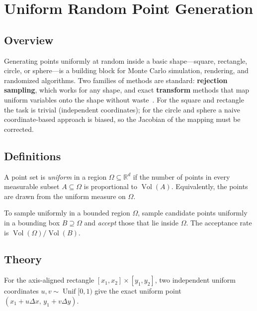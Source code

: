 \section{Uniform Random Point Generation}
\label{sec:uniform_random_points}

\subsection{Overview}
Generating points uniformly at random inside a
basic shape---square, rectangle, circle, or sphere---is a building block for
Monte Carlo simulation, rendering, and randomized algorithms. Two families of
methods are standard: \textbf{rejection sampling}, which works for any shape,
and exact \textbf{transform} methods that map uniform variables onto the shape
without waste~\cite{devroye1986}. For the square and rectangle the task is
trivial (independent coordinates); for the circle and sphere a naive
coordinate-based approach is biased, so the Jacobian of the mapping must be
corrected.

\subsection{Definitions}
\begin{definition}\label{def:uniform_point_set}
A point set is \emph{uniform} in a region $\Omega \subseteq \mathbb{R}^d$ if
the number of points in every measurable subset $A \subseteq \Omega$ is
proportional to $\operatorname{Vol}(A)$. Equivalently, the points are drawn
from the uniform measure on $\Omega$.
\end{definition}

\begin{definition}\label{def:rejection_shape}
To sample uniformly in a bounded region $\Omega$,
sample candidate points uniformly in a bounding box $B \supseteq \Omega$ and
\emph{accept} those that lie inside $\Omega$. The acceptance rate is
$\operatorname{Vol}(\Omega) / \operatorname{Vol}(B)$.
\end{definition}

\subsection{Theory}
For the axis-aligned rectangle $[x_1, x_2] \times [y_1, y_2]$, two independent
uniform coordinates $u, v \sim \operatorname{Unif}[0, 1)$ give the exact uniform point
$(x_1 + u \Delta x, \, y_1 + v \Delta y)$.


